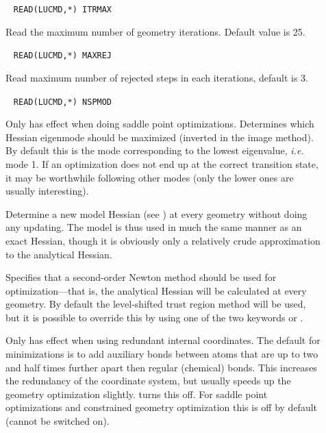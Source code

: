 \begin{description}
\item[]\verb| |
\newline
\verb|READ(LUCMD,*) ITRMAX|

Read the maximum number of geometry iterations.
Default value is 25.

\item[]\verb| |
\newline
\verb|READ(LUCMD,*) MAXREJ|

Read maximum number of rejected steps
in each iterations, default is 3.

\item[]\verb| |
\newline
\verb|READ(LUCMD,*) NSPMOD|

Only has effect when doing saddle point optimizations.
Determines which Hessian eigenmode should be maximized (inverted in the image
method). By default this is the mode corresponding to the lowest
eigenvalue, {\it i.e.\/} mode 1. If an optimization does not end up at
the correct transition state, it may be worthwhile following other modes
(only the lower ones are usually interesting).

\item[]
Determine a new model Hessian (see )
at every geometry without doing any updating. The model is thus used
in much the same manner as an exact Hessian, though it is obviously
only a relatively crude approximation to the analytical Hessian.

\item[]
Specifies that a second-order Newton method should be used for
optimization---that is, the analytical Hessian will be calculated at
every geometry. By default the level-shifted trust region method will
be used, but it is possible to override this by using one of the two
keywords  or .

\item[]
Only has effect when using redundant internal coordinates. The default
for minimizations is to add auxiliary bonds between atoms that are up
to two and half times further apart then regular (chemical)
bonds. This increases the redundancy of the coordinate system, but
usually speeds up the geometry optimization slightly. 
turns this off. For saddle point optimizations and constrained
geometry optimization this is off by default (cannot be switched on).


\end{description}
